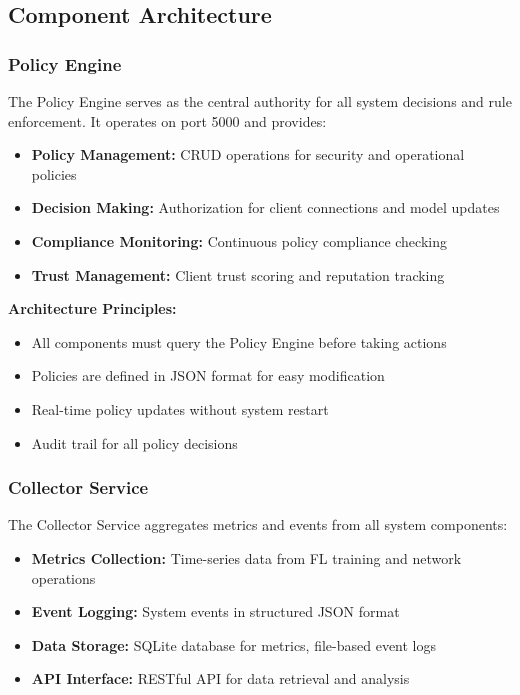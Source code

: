 \documentclass[12pt,a4paper,twoside]{article}
\begin{document}
\subsection{Component Architecture}

\subsubsection{Policy Engine}

The Policy Engine serves as the central authority for all system decisions and rule enforcement. It operates on port 5000 and provides:

\begin{itemize}
    \item \textbf{Policy Management:} CRUD operations for security and operational policies
    \item \textbf{Decision Making:} Authorization for client connections and model updates
    \item \textbf{Compliance Monitoring:} Continuous policy compliance checking
    \item \textbf{Trust Management:} Client trust scoring and reputation tracking
\end{itemize}

\textbf{Architecture Principles:}
\begin{itemize}
    \item All components must query the Policy Engine before taking actions
    \item Policies are defined in JSON format for easy modification
    \item Real-time policy updates without system restart
    \item Audit trail for all policy decisions
\end{itemize}

\subsubsection{Collector Service}

The Collector Service aggregates metrics and events from all system components:

\begin{itemize}
    \item \textbf{Metrics Collection:} Time-series data from FL training and network operations
    \item \textbf{Event Logging:} System events in structured JSON format
    \item \textbf{Data Storage:} SQLite database for metrics, file-based event logs
    \item \textbf{API Interface:} RESTful API for data retrieval and analysis
\end{itemize}
\end{document}

